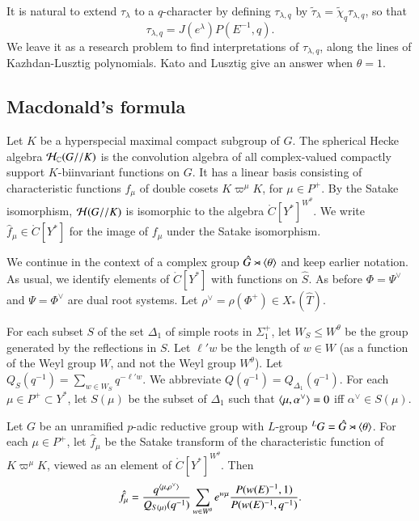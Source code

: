 It is natural to extend $\tau_\lambda$ to a $q$-character by defining $\tau_{\lambda,q}$ by
$\tilde \tau_\lambda = \tilde \chi_q\tau_{\lambda,q} $, so that
\begin{equation}
\tau_{\lambda,q} = J(e^\lambda) P(E^{-1},q).
\end{equation}
We leave it as a research problem to find interpretations of $\tau_{\lambda,q}$, along the lines of Kazhdan-Lusztig
polynomials.  Kato and Lusztig give an answer when $\theta=1$.


\subsection{Macdonald's formula}\label{sec:macdonald}



Let $K$ be a hyperspecial maximal compact subgroup of $G$.  The spherical Hecke
algebra $\mathcal H_{\mathbb{C}}(G//K)$ 
is the convolution algebra of all complex-valued compactly support $K$-biinvariant functions
on $G$.  It has a linear basis consisting of characteristic functions $f_\mu$ of double cosets
$K\varpi^\mu K$, for $\mu\in P^+$.    By the Satake isomorphism, $\mathcal H(G//K)$ is isomorphic
to the algebra $\ring{C}[Y^*]^{W^\theta}$.   We write $\hat f_\mu\in \ring{C}[Y^*]$ 
for the image of $f_\mu$
under the Satake isomorphism.

We continue in the context of a complex group $\hat G \rtimes \langle{\theta}\rangle$ and keep earlier notation.
As usual, we identify elements of $\ring{C}[Y^*]$ with functions on $\hat S$.  
As before $\Phi=\Psi^\vee$ and $\Psi = \Phi^\vee$ are dual root systems.
Let $\rho^\vee = \rho(\Phi^+)\in X_*(\hat T)$.


For each subset $S$
of the set $\Delta_1$ of simple  roots in $\Sigma^+_1$,
 let $W_S\le W^\theta$ be the group generated by the reflections in $S$.
Let $\ell' w$ be the length of $w\in W$ (as a function of the Weyl group $W$, and not the Weyl group $W^\theta$).
Let $Q_S(q^{-1}) = \sum_{w\in W_S} q^{-\ell'w}$.  We abbreviate $Q(q^{-1}) = Q_{\Delta_1}(q^{-1})$.
For each $\mu\in P^+\subset Y^*$, let $S(\mu)$ be the subset of $\Delta_1$ such that $\langle{\mu,\alpha^\vee}\rangle=0$ iff $\alpha^\vee\in S(\mu)$.

\begin{theorem}\label{thm:macdonald}
Let $G$ be an unramified $p$-adic reductive group with $L$-group ${}^LG = \hat G \rtimes \langle{\theta}\rangle$.
For each $\mu\in P^+$, 
let $\hat f_\mu$ be the Satake transform of the characteristic function of $K\varpi^\mu K$, viewed as an element
of $\ring{C}[Y^*]^{W^\theta}$.  Then
\[
\hat f_\mu = \frac{q^{\langle{\mu,\rho^\vee}\rangle}}{ Q_{S(\mu)}(q^{-1})} \sum_{w\in W^\theta} e^{w\mu} \frac{P(w(E)^{-1},1)}{P(w(E)^{-1},q^{-1})}.
\]
\end{theorem}

